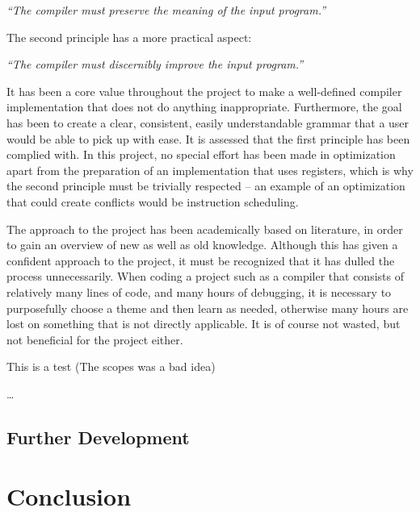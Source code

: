 \begin{displayquote}
    \textit{``The compiler must preserve the meaning of the input program.''}
\end{displayquote}
\hspace*{}

The second principle has a more practical aspect:

\begin{displayquote}
    \textit{``The compiler must discernibly improve the input program.''}
\end{displayquote}
\hspace*{}

It has been a core value throughout the project to make a well-defined compiler implementation that does not do anything inappropriate. Furthermore, the goal has been to create a clear, consistent, easily understandable grammar that a user would be able to pick up with ease. It is assessed that the first principle has been complied with. In this project, no special effort has been made in optimization apart from the preparation of an implementation that uses registers, which is why the second principle must be trivially respected -- an example of an optimization that could create conflicts would be instruction scheduling.

The approach to the project has been academically based on literature, in order to gain an overview of new as well as old knowledge. Although this has given a confident approach to the project, it must be recognized that it has dulled the process unnecessarily. When coding a project such as a compiler that consists of relatively many lines of code, and many hours of debugging, it is necessary to purposefully choose a theme and then learn as needed, otherwise many hours are lost on something that is not directly applicable. It is of course not wasted, but not beneficial for the project either.

This is a test (The scopes was a bad idea)

\dots{}

\section{Further Development}
 
\chapter{Conclusion}

\cleardoublepage
{}
{}
\printbibliography
